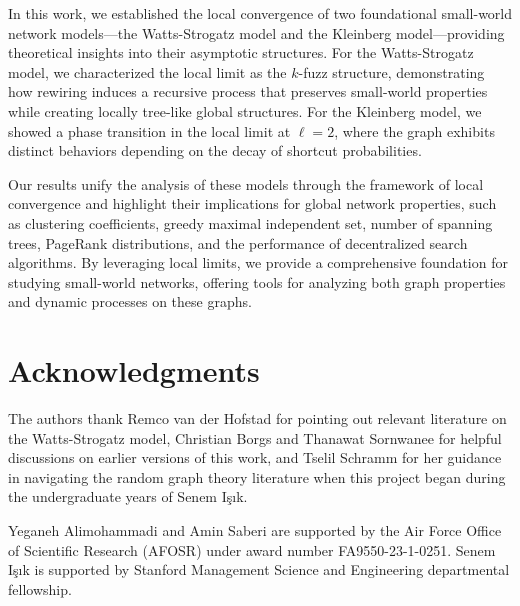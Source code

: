 \documentclass[10pt]{amsart}
\begin{document}
In this work, we established the local convergence of two foundational small-world network models—the Watts-Strogatz model and the Kleinberg model—providing theoretical insights into their asymptotic structures. For the Watts-Strogatz model, we characterized the local limit as the \(k\)-fuzz structure, demonstrating how rewiring induces a recursive process that preserves small-world properties while creating locally tree-like global structures. For the Kleinberg model, we showed a phase transition in the local limit at \(\ell = 2\), where the graph exhibits distinct behaviors depending on the decay of shortcut probabilities. 

Our results unify the analysis of these models through the framework of local convergence and highlight their implications for global network properties, such as clustering coefficients,  greedy maximal independent
set, number of spanning trees, PageRank distributions, and the performance of decentralized search algorithms. By leveraging local limits, we provide a comprehensive foundation for studying small-world networks, offering tools for analyzing both graph properties and dynamic processes on these graphs. 

\section*{Acknowledgments}

The authors thank Remco van der Hofstad for pointing out relevant literature on the Watts-Strogatz model, Christian Borgs and Thanawat Sornwanee for helpful discussions on earlier versions of this work, and Tselil Schramm for her guidance in navigating the random graph theory literature when this project began during the undergraduate years of Senem I\c{s}\i{}k.

Yeganeh Alimohammadi and Amin Saberi are supported by the Air Force Office of Scientific Research (AFOSR) under award number FA9550-23-1-0251. Senem I\c{s}\i{}k is supported by Stanford Management Science and Engineering departmental fellowship.




\appendix
\end{document}
